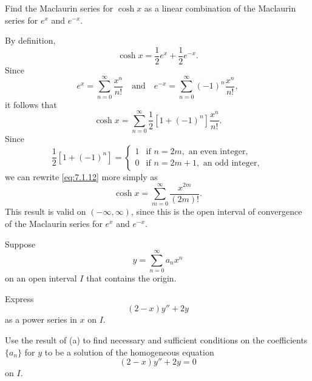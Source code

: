 \begin{example}\label{example:7.1.5}
Find the Maclaurin series for $\cosh x$  as a linear
combination of the Maclaurin series for $e^x$ and $e^{-x}$.
\end{example}

\begin{solution}
By definition,
\[
\cosh x=\frac{1}{2}e^x+\frac{1}{2}e^{-x}.
\]
Since
\[ e^x=\sum_{n=0}^\infty  \frac{x^n}{n!}\quad\text{and}\quad
 e^{-x}=\sum_{n=0}^\infty (-1)^n \frac{x^n}{n!},
\]
it follows that
\begin{equation} \label{eq:7.1.12}
\cosh x=\sum_{n=0}^\infty \frac{1}{2}[1+(-1)^n]\frac{x^n}{n!}.
\end{equation}
Since
\[
\frac{1}{2}[1+(-1)^n]=\begin{cases}
1&\text{if }n=2m,\text{ an even integer},\\
0&\text{if }n=2m+1,\text{ an odd integer},
\end{cases}
\]
we can rewrite \eqref{eq:7.1.12} more simply as
\[
\cosh x=\sum_{m=0}^\infty\frac{x^{2m}}{(2m)!}.
\]
This result is valid on $(-\infty,\infty)$, since this is the open
interval of convergence of the Maclaurin series for $e^x$ and
$e^{-x}$.
\end{solution}

\begin{example}\label{example:7.1.6}
Suppose
\[
y=\sum_{n=0}^\infty a_n x^n
\]
 on an open interval $I$ that contains the origin.
\begin{alist}
\item %
Express
\[
(2-x)y''+2y
\]
as a power series in $x$ on $I$.
\item %
Use the result of (a) to find necessary and sufficient conditions
on the coefficients $\{a_n\}$ for
 $y$ to be  a solution of the homogeneous equation
\begin{equation} \label{eq:7.1.13}
(2-x)y''+2y=0
\end{equation}
on $I$.
\end{alist}
\end{example}

